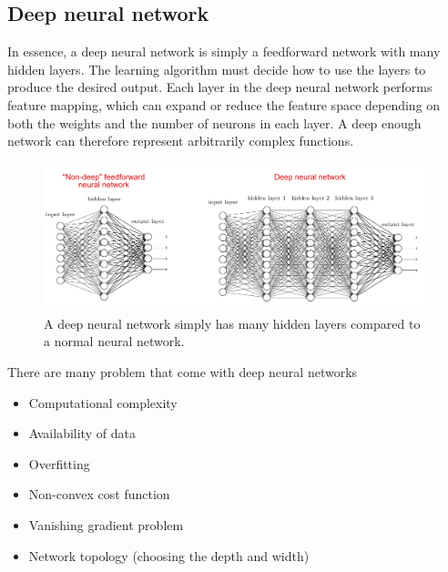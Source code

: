 \documentclass[CS5104-Notes.tex]{subfiles}
\begin{document}
\subsection{Deep neural network}
In essence, a deep neural network is simply a feedforward network with many hidden layers. The learning algorithm must decide how to use the layers to produce the desired output. Each layer in the deep neural network performs feature mapping, which can expand or reduce the feature space depending on both the weights and the number of neurons in each layer. A deep enough network can therefore represent arbitrarily complex functions.
\begin{figure}[H]
  \centering
  \includegraphics[width=1\textwidth, keepaspectratio]{imgs/deep-neural-network.png}
  \caption{A deep neural network simply has many hidden layers compared to a normal neural network.}
\end{figure}
\noindent
There are many problem that come with deep neural networks
\begin{itemize}
\item Computational complexity
\item Availability of data
\item Overfitting
\item Non-convex cost function
\item Vanishing gradient problem
\item Network topology (choosing the depth and width)
\end{itemize}
\end{document}

